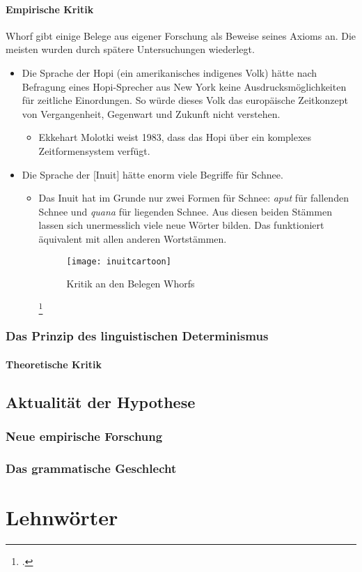 \documentclass[12pt]{scrreprt}
\begin{document}
		\subsubsection{Empirische Kritik}
		\label{sec:sawo_lr_empkritik}
		Whorf gibt einige Belege aus eigener Forschung als Beweise seines Axioms an.
		Die meisten wurden durch spätere Untersuchungen wiederlegt.
		\begin{itemize}
			\item Die Sprache der Hopi (ein amerikanisches indigenes Volk) hätte nach
			Befragung eines Hopi-Sprecher aus New York keine
			Ausdrucksmöglichkeiten für zeitliche Einordungen. So würde dieses
			Volk das europäische Zeitkonzept von Vergangenheit, Gegenwart und
			Zukunft nicht verstehen.
				\begin{itemize}
					\item Ekkehart Molotki weist 1983, dass das Hopi über ein komplexes
					Zeitformensystem verfügt.\autocite{wiki:Sapir-Whorf-Hypothese}
				\end{itemize}
				\item Die Sprache der [Inuit] hätte enorm viele Begriffe für Schnee.
				\begin{itemize}
					\item Das Inuit hat im Grunde nur zwei Formen für Schnee: \textit{aput}
					für fallenden Schnee und \textit{quana} für liegenden Schnee. Aus
					diesen beiden Stämmen lassen sich unermesslich viele neue Wörter
					bilden. Das funktioniert äquivalent mit allen anderen Wortstämmen.\autocite{wiki:Sapir-Whorf-Hypothese}
				\begin{figure}[!htb]
					\centering
					\texttt{[image: inuitcartoon]}
					\caption[Kritik an den Belegen Whorfs {\autocite{cartoon:Inuit}}]{Kritik an den Belegen Whorfs\footnotemark}
					\label{fig:sawo_inuitcartoon}
				\end{figure}
				\footcitetext{cartoon:Inuit}
				\end{itemize}
		\end{itemize}
		\subsection{Das Prinzip des linguistischen Determinismus}
		\label{sec:sawo_lingdetermin}

		\subsubsection{Theoretische Kritik}
		\label{sec:sawo_ld_theokritik}
	\section{Aktualität der Hypothese}
	\label{sec:sawo_aktualität}
		\subsection{Neue empirische Forschung}
		\label{sec:sawo_empforschung}
		\subsection{Das grammatische Geschlecht}
		\label{sec:sawo_gramgeschlecht}

\chapter{Lehnwörter}
\label{chap:lehnwörter}

\printbibliography
\end{document}
